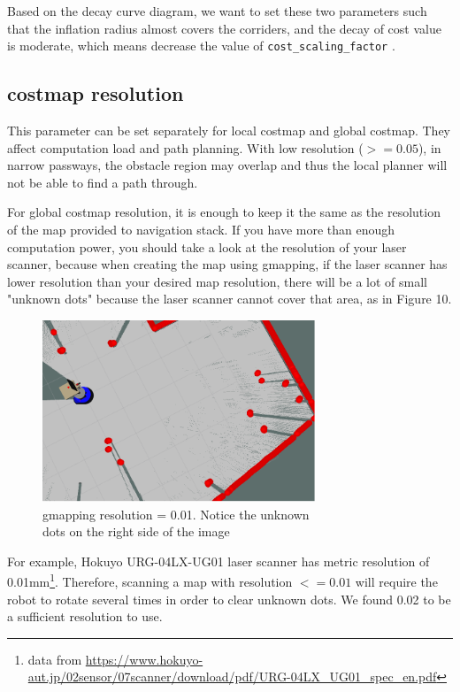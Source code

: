 \documentclass[12pt]{article}
\begin{document}
Based on the decay curve diagram, we want to set these two parameters such that the inflation radius almost covers the corriders, and the decay of cost value is moderate, which means decrease the value of \texttt{cost\_scaling\_factor} .

\subsection{costmap resolution} 
This parameter can be set separately for local costmap and global costmap. They affect computation load and path planning. With low resolution ($>=0.05$), in narrow passways, the obstacle region may overlap and thus the local planner will not be able to find a path through.

For global costmap resolution, it is enough to keep it the same as the resolution of the map provided to navigation stack. If you have more than enough computation power,
you should take a look at the resolution of your laser scanner, because when creating the map using gmapping, if the laser scanner has lower resolution than your desired
map resolution, there will be a lot of small "unknown dots" because the laser scanner cannot cover that area, as in Figure 10.
\begin{figure}[!h]
    \begin{center}
        \includegraphics[width=22em]{resolutionholes.png}
      \caption{gmapping resolution = 0.01. Notice the unknown\\ dots on the right side of the image}
    \end{center}
\end{figure}

For example, Hokuyo URG-04LX-UG01 laser scanner has metric resolution of 0.01mm\footnote{data from \url{https://www.hokuyo-aut.jp/02sensor/07scanner/download/pdf/URG-04LX_UG01_spec_en.pdf}}. Therefore, scanning a map with resolution $<=0.01$ will require the robot to rotate several times in order to clear unknown dots. We found 0.02 to be a sufficient resolution
to use.
\end{document}
